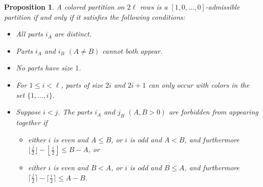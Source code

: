 \documentclass[pdftex]{sigma}
\numberwithin{equation}{section}
\newtheorem{Proposition}[Theorem]{Proposition}
\theoremstyle{definition}
\begin{document}
\begin{Proposition} \label{pr:eq}
A colored partition on $2\ell$ rows is a $[1,0,\dots,0]$-admissible partition if and only if it satisfies the following conditions:
\begin{itemize}\itemsep=0pt
\item All parts $i_A$ are distinct.
\item Parts $i_A$ and $i_B$ $(A\ne B)$ cannot both appear.
\item No parts have size $1$.
\item For $1\le i < \ell$, parts of size $2i$ and $2i+1$ can only occur with colors in the set $\{1,\dots,i\}$.
\item Suppose $i< j$. The parts $i_A$ and $j_{B}$ $(A,B>0)$ are forbidden from appearing together if
\begin{itemize}\itemsep=0pt
\item either $i$ is even and $A \le B$, or $i$ is odd and $A < B$, and furthermore $ \bigl\lfloor\frac j2\bigr\rfloor-\left\lfloor\frac i2\right\rfloor\le B-A$, or
\item either $i$ is even and $B< A$, or $i$ is odd and $B\le A$, and furthermore
$ \bigl\lceil\frac j2\bigr\rceil-\bigl\lceil\frac i2\bigr\rceil\le A-B$.
\end{itemize}
\end{itemize}
\end{Proposition}
\end{document}

